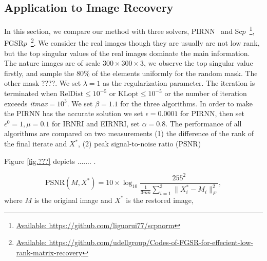 \documentclass[twoside,11pt]{article}
\numberwithin{equation}{section}
\begin{document}
\subsection{Application to Image Recovery}

In this section, we compare  our method with three solvers, PIRNN~\cite{opt_simu_svd_2017} and Sc$p$~\cite{Relax_NCVX_CNN_RPCA_2013}\footnote{\href{https://github.com/liguorui77/scpnorm}{Available: https://github.com/liguorui77/scpnorm}
},  
FGSR$p$~\cite{LRMR_GroupSparse_2019}\footnote{\href{https://github.com/udellgroup/Codes-of-FGSR-for-effecient-low-rank-matrix-recovery}{Available: https://github.com/udellgroup/Codes-of-FGSR-for-effecient-low-rank-matrix-recovery}
}.
We consider the real images though they are usually are not low rank, but the top singular values of the real images   dominate the main information. The nature images are of scale $300 \times 300 \times 3 $, we observe the top singular value firstly, and sample the $80\% $ of the elements uniformly   for the random mask.  The other mask ????.   We set $\lambda = 1$ as the regularization parameter. 
The iteration is terminated when  $\text{RelDist}\le{10}^{-5}$ or $\text{KLopt}\le 10^{-5} $ or the number of iteration exceeds \textit{itmax}$=10^{3}$.  
We set  $\beta = 1.1$ for the three algorithms.
In order to make the PIRNN has the accurate solution we set $\epsilon = 0.0001 $ for PIRNN, then set $\epsilon^{0} = 1, \mu=0.1 $ for IRNRI and EIRNRI, set $\alpha=0.8$. 
The performance of all algorithms are compared on   two measurements  
(1)  the difference of the rank of the final iterate  and $X^{*}$,
(2) peak signal-to-noise ratio (PSNR)   



Figure \ref{fig.???} depicts ....... . 


\begin{equation}
  \text{PSNR} (M,X^{*}) = 10 \times \log_{10}\frac{255^{2}}{\frac{1}{3mn}\sum_{i=1}^{3}\|X_{i}^{*}-M_{i}\|_{F}^{2}}, 
\end{equation}
where $M $ is the original image and $X^{*} $ is the restored image, 
\end{document}
